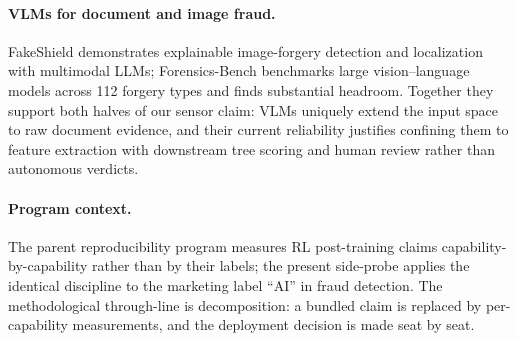 \paragraph{VLMs for document and image fraud.} FakeShield
\citep{xu2024fakeshield} demonstrates explainable image-forgery detection and
localization with multimodal LLMs; Forensics-Bench \citep{wang2025forensicsbench}
benchmarks large vision--language models across 112 forgery types and finds
substantial headroom. Together they support both halves of our sensor claim:
VLMs uniquely extend the input space to raw document evidence, and their
current reliability justifies confining them to feature extraction with
downstream tree scoring and human review rather than autonomous verdicts.

\paragraph{Program context.} The parent reproducibility program measures
RL post-training claims capability-by-capability rather than by their labels;
the present side-probe applies the identical discipline to the marketing label
``AI'' in fraud detection. The methodological through-line is decomposition:
a bundled claim is replaced by per-capability measurements, and the deployment
decision is made seat by seat.
